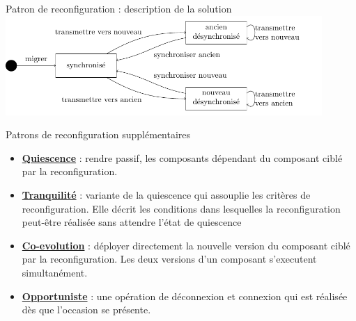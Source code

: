 \begin{frame}{Patron de reconfiguration : description de la solution}
\includegraphics[width=12cm]{imgs/slide_solution_coevolution.pdf}
\end{frame}


\begin{frame}{Patrons de reconfiguration supplémentaires}
\begin{itemize}
\setlength\itemsep{0.7cm}
\item \underline{\textbf{Quiescence}} : rendre passif,
les composants dépendant du composant ciblé par la reconfiguration. 
\item \underline{\textbf{Tranquilité}} : variante de la quiescence qui assouplie
les critères de reconfiguration. Elle décrit les conditions dans
lesquelles la reconfiguration peut-être réalisée sans attendre l'état de
quiescence
\item \underline{\textbf{Co-evolution}} : déployer directement la nouvelle version du composant ciblé par la
reconfiguration. Les deux versions d'un
composant s'executent simultanément. 
\item \underline{\textbf{Opportuniste}} : une opération de
déconnexion et connexion qui est réalisée dès que l'occasion se
présente.  
\end{itemize}
\end{frame}
